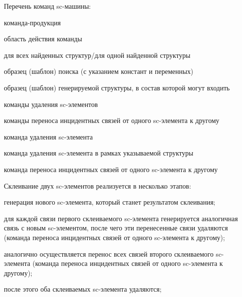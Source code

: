 Перечень команд sc-машины:
\begin{textitemize}
	\item команда-продукция
	\begin{textitemize}
		\item область действия команды
		\item для всех найденных структур/для одной найденной структуры
		\item образец (шаблон) поиска (с указанием констант и переменных)
		\item образец (шаблон) генерируемой структуры, в состав которой могут входить
		\begin{textitemize}
			\item команды удаления sc-элементов
			\item команды переноса инцидентных связей от одного sc-элемента к другому
		\end{textitemize}
	\end{textitemize}
	\item команда удаления sc-элемента
	\item команда удаления sc-элемента в рамках указываемой структуры %
	\item команда переноса инцидентных связей от одного sc-элемента к другому
\end{textitemize}

Склеивание двух sc-элементов реализуется в несколько этапов:
\begin{textitemize}
	\item генерация нового sc-элемента, который станет результатом склеивания;
	\item для каждой связи первого склеиваемого sc-элемента генерируется аналогичная связь с новым sc-элементом, после чего эти перенесенные связи удаляются (команда переноса инцидентных связей от одного sc-элемента к другому);
	\item аналогично осуществляется перенос всех связей второго склеиваемого sc-элемента (команда переноса инцидентных связей от одного sc-элемента к другому); %
	\item после этого оба склеиваемых sc-элемента удаляются;
\end{textitemize}


